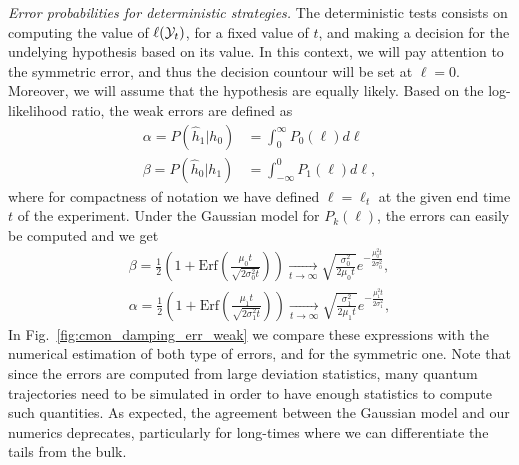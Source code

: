 \emph{Error probabilities for deterministic strategies.}
The deterministic tests consists on computing the value of $\ell(\mathcal{Y}_t)$, for a fixed value of $t$, and making a decision for the undelying hypothesis based on its value. In this context, we will pay attention to the symmetric error, and thus the decision countour will be set at $\ell = 0$. Moreover, we will assume that the hypothesis are equally likely. Based on the log-likelihood ratio, the weak errors are defined as
\begin{align}\label{eq:cmon_errors_weak_gaussian}
 \alpha = P(\hat{h}_{1}|h_{0})&=\int_{0}^{\infty}P_{0}(\ell)d\ell \\
 \beta = P(\hat{h}_{0}|h_{1})&= \int_{-\infty}^{0} P_{1}(\ell)d\ell,\nonumber
\end{align}
where for compactness of notation we have defined $\ell=\ell_{t}$ at the given end time $t$ of the experiment.
Under the Gaussian model for $P_k(\ell)$, the errors can easily be computed and we get
\begin{align}\label{eq:cmon_errors_gaussian_formula}
\beta =\frac{1}{2}\left(1+\text{Erf}\left(\frac{\mu_{0} t}{\sqrt{2\sigma^2_{0} t}} \right)\right) \underset{t\rightarrow\infty}{\rightarrow} \sqrt{\frac{\sigma_{0}^{2} }{2\mu_{0} t }}e^{-\frac{\mu_{0}^{2}t}{2\sigma_{0}^{2}}},\\
\alpha =\frac{1}{2}\left(1+\text{Erf}\left(\frac{\mu_{1} t}{\sqrt{2\sigma_{1}^{2} t}} \right)\right)  \underset{t\rightarrow\infty}{\rightarrow} \sqrt{\frac{\sigma_{1}^{2} }{2\mu_{1} t }}e^{-\frac{\mu_{1}^{2}t}{2\sigma_{1}^{2}}}, \nonumber
\end{align}
In Fig.~\ref{fig:cmon_damping_err_weak} we compare these expressions with the numerical estimation of both type of errors, and for the symmetric one. Note that since the errors are computed from large deviation statistics, many quantum trajectories need to be simulated in order to have enough statistics to compute such quantities. As expected, the agreement between the Gaussian model and our numerics deprecates, particularly for long-times where we can differentiate the tails from the bulk.

